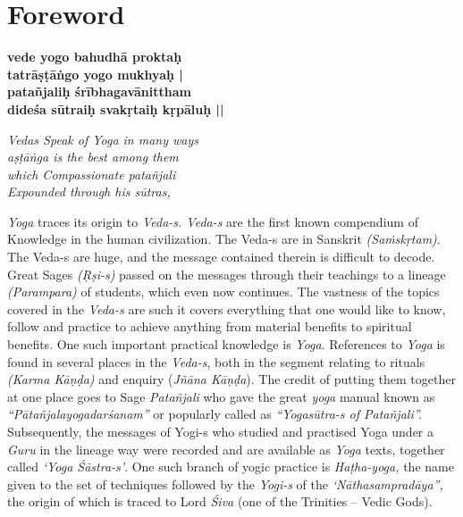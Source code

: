 \thispagestyle{empty}

\chapter*{Foreword}

\begin{shloka}
\centering
\noindent
\textbf{vede yogo bahudhā proktaḥ}\\
\textbf{tatrāṣṭāṅgo yogo mukhyaḥ |}\\
\textbf{patañjaliḥ śrībhagavānittham}\\
\textbf{dideśa sūtraiḥ svakṛtaiḥ kṛpāluḥ ||}
\smallskip

\textit{Vedas Speak of Yoga in many ways}\\
\textit{aṣṭāṅga is the best among them}\\
\textit{which Compassionate patañjali}\\
\textit{Expounded through his sūtras,}
\end{shloka}

\noindent \textit{Yoga} traces its origin to \textit{Veda-s. Veda-s} are the first known compendium of Knowledge in the human civilization.  The Veda-s are in Sanskrit \textit{(Saṁskṛtam)}. The Veda-s are huge, and the message contained therein is difficult to decode. Great Sages \textit{(Ṛṣi-s)} passed on the messages through their teachings to a lineage \textit{(Parampara)} of students, which even now continues. The vastness of the topics covered in the \textit{Veda-s} are such it covers everything that one would like to know, follow and practice to achieve anything from material benefits to spiritual benefits. One such important practical knowledge is \textit{Yoga}.  References to \textit{Yoga} is found in several places in the \textit{Veda-s}, both in the segment relating to rituals \textit{(Karma Kāṇḍa)} and enquiry (\textit{Jñāna Kāṇḍa}). The credit of putting them together at one place goes to Sage \textit{Patañjali} who gave the great \textit{yoga} manual known as \textit{“Pātañjalayogadarśanam”} or popularly called as \textit{“Yogasūtra-s of Patañjali”.} Subsequently, the messages of Yogi-s who studied and practised Yoga under a \textit{Guru} in the lineage way were recorded and are available as \textit{Yoga} texts, together called \textit{‘Yoga Śāstra-s’}.  One such branch of yogic practice is \textit{Haṭha-yoga,} the name given to the set of techniques followed by the \textit{Yogi-s} of the \textit{‘Nāthasampradāya”,} the origin of which is traced to Lord \textit{Śiva} (one of the Trinities – Vedic Gods).

